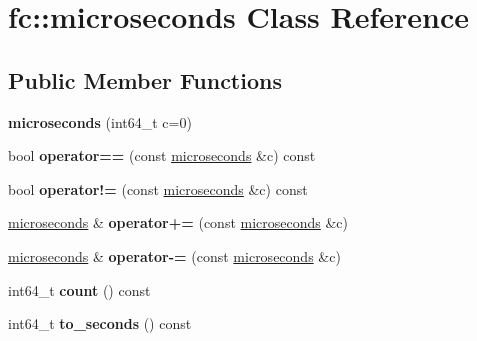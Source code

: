 \hypertarget{classfc_1_1microseconds}{}\section{fc\+:\+:microseconds Class Reference}
\label{classfc_1_1microseconds}
\subsection*{Public Member Functions}
\begin{DoxyCompactItemize}
\item 
\mbox{\label{classfc_1_1microseconds_a78f62fee263dcd62757df53148dbb3c8}} 
{\bfseries microseconds} (int64\+\_\+t c=0)
\item 
\mbox{\label{classfc_1_1microseconds_a4ef8353a74c1f7dd4ae84e850f59a94a}} 
bool {\bfseries operator==} (const \mbox{\hyperlink{classfc_1_1microseconds}{microseconds}} \&c) const
\item 
\mbox{\label{classfc_1_1microseconds_a47acd58eabdf1b5d1e023d8a69dd37cd}} 
bool {\bfseries operator!=} (const \mbox{\hyperlink{classfc_1_1microseconds}{microseconds}} \&c) const
\item 
\mbox{\label{classfc_1_1microseconds_a7057e7821df5af6e99737bd765f60953}} 
\mbox{\hyperlink{classfc_1_1microseconds}{microseconds}} \& {\bfseries operator+=} (const \mbox{\hyperlink{classfc_1_1microseconds}{microseconds}} \&c)
\item 
\mbox{\label{classfc_1_1microseconds_a17b674779305e76b06ec25e456775fbf}} 
\mbox{\hyperlink{classfc_1_1microseconds}{microseconds}} \& {\bfseries operator-\/=} (const \mbox{\hyperlink{classfc_1_1microseconds}{microseconds}} \&c)
\item 
\mbox{\label{classfc_1_1microseconds_ad510f79ef3c9b3d54fb16ef2d2c457b5}} 
int64\+\_\+t {\bfseries count} () const
\item 
\mbox{\label{classfc_1_1microseconds_a32d2c09e50c2fd23e9e5866d9dbbc870}} 
int64\+\_\+t {\bfseries to\+\_\+seconds} () const
\end{DoxyCompactItemize}

